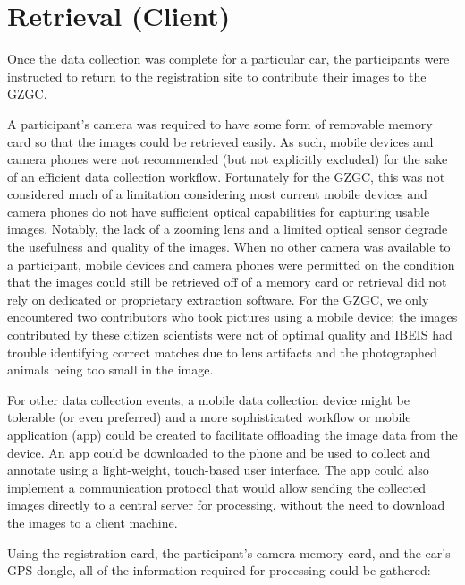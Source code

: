 \section{Retrieval (Client)} \label{sec:retrieval}
Once the data collection was complete for a particular car, the participants were instructed to return to the registration site to contribute their images to the GZGC.

A participant's camera was required to have some form of removable memory card so that the images could be retrieved easily.  As such, mobile devices and camera phones were not recommended (but not explicitly excluded) for the sake of an efficient data collection workflow.  Fortunately for the GZGC, this was not considered much of a limitation considering most current mobile devices and camera phones do not have sufficient optical capabilities for capturing usable images.   Notably, the lack of a zooming lens and a limited optical sensor degrade the usefulness and quality of the images.  When no other camera was available to a participant, mobile devices and camera phones were permitted on the condition that the images could still be retrieved off of a memory card or retrieval did not rely on dedicated or proprietary extraction software.  For the GZGC, we only encountered two contributors who took pictures using a mobile device; the images contributed by these citizen scientists were not of optimal quality and IBEIS had trouble identifying correct matches due to lens artifacts and the photographed animals being too small in the image.

For other data collection events, a mobile data collection device might be tolerable (or even preferred) and a more sophisticated workflow or mobile application (app) could be created to facilitate offloading the image data from the device.  An app could be downloaded to the phone and be used to collect and annotate using a light-weight, touch-based user interface.  The app could also implement a communication protocol that would allow sending the collected images directly to a central server for processing, without the need to download the images to a client machine.

Using the registration card, the participant's camera memory card, and the car's GPS dongle, all of the information required for processing could be gathered:

